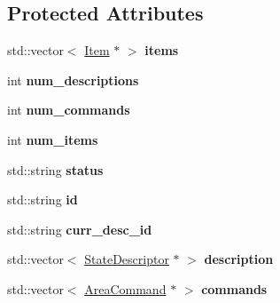 \subsection*{\-Protected \-Attributes}
\begin{DoxyCompactItemize}
\item 
\hypertarget{class_area_a8fcfd7b9f54f722a6bf8c68ac26ea4f6}{
std\-::vector$<$ \hyperlink{class_item}{\-Item} $\ast$ $>$ {\bfseries items}}
\label{class_area_a8fcfd7b9f54f722a6bf8c68ac26ea4f6}

\item 
\hypertarget{class_area_a4ec123111d0eb0346cc3fa55ee7328e9}{
int {\bfseries num\-\_\-descriptions}}
\label{class_area_a4ec123111d0eb0346cc3fa55ee7328e9}

\item 
\hypertarget{class_area_a698aec5d64c6990033fd3b029c40c117}{
int {\bfseries num\-\_\-commands}}
\label{class_area_a698aec5d64c6990033fd3b029c40c117}

\item 
\hypertarget{class_area_a29d6271cf822fe3c7865e249643b0728}{
int {\bfseries num\-\_\-items}}
\label{class_area_a29d6271cf822fe3c7865e249643b0728}

\item 
\hypertarget{class_area_ab5b23c6cefb5ff678f5544d7b5900b7b}{
std\-::string {\bfseries status}}
\label{class_area_ab5b23c6cefb5ff678f5544d7b5900b7b}

\item 
\hypertarget{class_area_a71dbaaeab0c2f2d0ba296593e59b22ce}{
std\-::string {\bfseries id}}
\label{class_area_a71dbaaeab0c2f2d0ba296593e59b22ce}

\item 
\hypertarget{class_area_a21fb316841238b230f351620ec97e3a6}{
std\-::string {\bfseries curr\-\_\-desc\-\_\-id}}
\label{class_area_a21fb316841238b230f351620ec97e3a6}

\item 
\hypertarget{class_area_af699bd40b15954f8403309672f01d44b}{
std\-::vector$<$ \hyperlink{class_state_descriptor}{\-State\-Descriptor} $\ast$ $>$ {\bfseries description}}
\label{class_area_af699bd40b15954f8403309672f01d44b}

\item 
\hypertarget{class_area_a5679c7f10791af2545d6853cf0f31ce1}{
std\-::vector$<$ \hyperlink{class_area_command}{\-Area\-Command} $\ast$ $>$ {\bfseries commands}}
\label{class_area_a5679c7f10791af2545d6853cf0f31ce1}

\end{DoxyCompactItemize}


